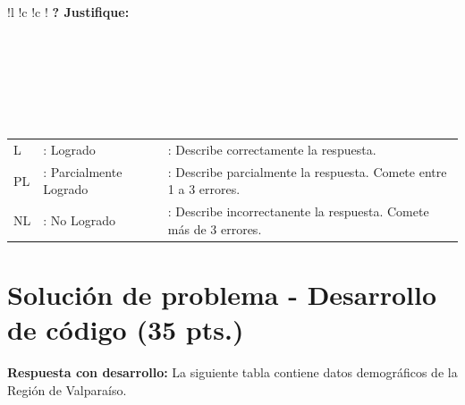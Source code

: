 \documentclass{exam}
\begin{document}
\begin{table}[H]
\begin{tabular}{
    !{\color{gray!50}\vrule}l
    !{\color{gray!50}\vrule}c
    !{\color{gray!50}\vrule}c
    !{\color{gray!50}\vrule}} 
     \hline
    \textbf{\textquestiondown ? Justifique:}  \\
    ~~~~~~~~~~~~~~~~~~~~~~~~~~~~~~~~~~~~~~~~~~~~~~~~~~~~~~~~~~~~~~~~~~~~~~~~~~~~~~~~~~~~~~~~~~~~~~~~~~~~~~~~~~~~~~~~~~~~~~~~~~~~~~~
    \\ \\ \\ \\ \\  \hline
\end{tabular}
\end{table}
\begin{table}[H]
    {\small
    \begin{tabular}{lll}
        L  & : Logrado    & : Describe correctamente la respuesta. \\
        PL  & : Parcialmente Logrado & : Describe parcialmente la respuesta. Comete entre 1 a 3 errores.  \\
        NL & : No Logrado & : Describe incorrectanente la respuesta. Comete m\'as de 3 errores. \\
    \end{tabular}}
\end{table}

\clearpage

\vspace{-7mm}
\section{\textbf{Soluci\'on de problema - Desarrollo de c\'odigo (35 pts.)}}

\noindent
\textbf{Respuesta con desarrollo:} La siguiente tabla contiene datos demogr\'aficos de la Regi\'on de Valpara\'iso. 
\end{document}
